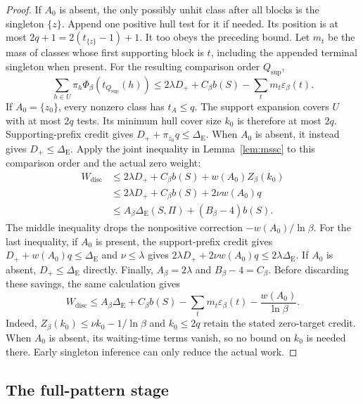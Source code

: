 \begin{proof}
If $A_0$ is absent, the only possibly unhit class after all blocks
is the singleton $\{z\}$. Append one positive hull test for it
if needed. Its position is at most $2q+1=2(t_{\{z\}}-1)+1$.
It too obeys the preceding bound.
Let $m_t$ be the mass of classes whose first supporting block is
$t$, including the appended terminal singleton when present.
For the resulting comparison order $Q_{\mathrm{sup}}$,
\[
 \sum_{h\in U}\pi_h\Phi_\beta(t_{Q_{\mathrm{sup}}}(h))
 \le2\lambda D_++C_\beta b(S)
       -\sum_t m_t\varepsilon_\beta(t).
\]
If $A_0=\{z_0\}$, every nonzero class has $t_A\le q$.
The support expansion covers $U$ with at most $2q$ tests.
Its minimum hull cover size $k_0$ is therefore at most $2q$.
Supporting-prefix credit gives
$D_++\pi_{z_0}q\le\Delta_{\mathrm E}$.
When $A_0$ is absent, it instead gives $D_+\le\Delta_{\mathrm E}$.
Apply the joint inequality in Lemma~\ref{lem:mssc} to this
comparison order and the actual zero weight:
\[
\begin{aligned}
 W_{\mathrm{disc}}
 &\le2\lambda D_++C_\beta b(S)+w(A_0)Z_\beta(k_0)\\
 &\le2\lambda D_++C_\beta b(S)+2\nu w(A_0)q\\
 &\le A_\beta\Delta_{\mathrm E}(S,\Pi)+(B_\beta-4)b(S).
\end{aligned}
\]
The middle inequality drops the nonpositive correction
$-w(A_0)/\ln\beta$. For the last inequality, if $A_0$ is present,
the support-prefix credit gives
$D_++w(A_0)q\le\Delta_{\mathrm E}$ and $\nu\le\lambda$ gives
$2\lambda D_++2\nu w(A_0)q\le2\lambda\Delta_{\mathrm E}$.
If $A_0$ is absent, $D_+\le\Delta_{\mathrm E}$ directly. Finally,
$A_\beta=2\lambda$ and $B_\beta-4=C_\beta$.
Before discarding these savings, the same calculation gives
\begin{equation}\label{eq:discrete-discovery-credit}
 W_{\mathrm{disc}}\le
 A_\beta\Delta_{\mathrm E}+C_\beta b(S)
 -\sum_t m_t\varepsilon_\beta(t)-\frac{w(A_0)}{\ln\beta}.
\end{equation}
Indeed, $Z_\beta(k_0)\le\nu k_0-1/\ln\beta$ and
$k_0\le2q$ retain the stated zero-target credit.
When $A_0$ is absent, its waiting-time terms vanish, so no
bound on $k_0$ is needed there.
Early singleton inference can only reduce the actual work.
\end{proof}

\subsection{The full-pattern stage}


